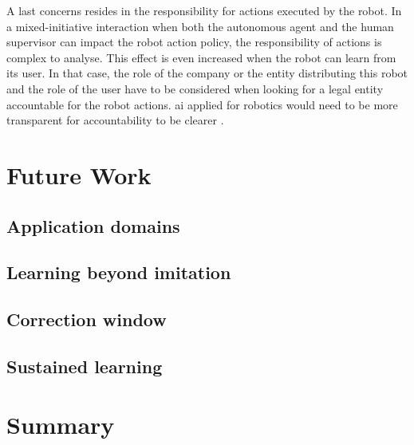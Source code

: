 A last concerns resides in the responsibility for actions executed by the robot. In a mixed-initiative interaction when both the autonomous agent and the human supervisor can impact the robot action policy, the responsibility of actions is complex to analyse. This effect is even increased when the robot can learn from its user. In that case, the role of the company or the entity distributing this robot and the role of the user have to be considered when looking for a legal entity accountable for the robot actions. \gls{ai} applied for robotics would need to be more transparent for accountability to be clearer \citep{wachter2017transparent}.


\section{Future Work}

\subsection{Application domains}

\subsection{Learning beyond imitation}

\subsection{Correction window}

\subsection{Sustained learning}

\section{Summary} \label{sec:disc_summary}
